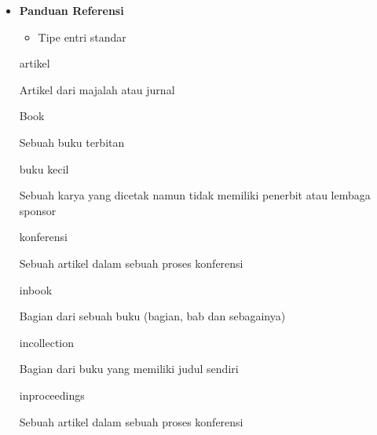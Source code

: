 \begin{itemize}
\vspace{12pt}
	\item {\fontsize{14pt}{14pt}\selectfont \textbf{Panduan Referensi}}\par

\begin{itemize}
	\item Tipe entri standar
\end{itemize}\par


artikel\par




Artikel dari majalah atau jurnal\par




Book\par




Sebuah buku terbitan\par




buku kecil\par




Sebuah karya yang dicetak namun tidak memiliki penerbit atau lembaga sponsor\par




konferensi\par




Sebuah artikel dalam sebuah proses konferensi\par




inbook\par




Bagian dari sebuah buku (bagian, bab dan sebagainya)\par




incollection\par




Bagian dari buku yang memiliki judul sendiri\par




inproceedings\par




Sebuah artikel dalam sebuah proses konferensi\par





\end{itemize}
